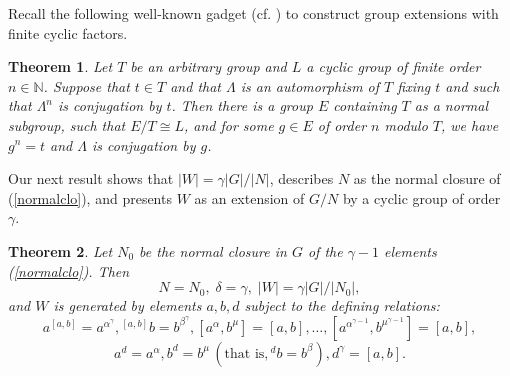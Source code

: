 \documentclass{amsart}
\newtheorem{theorem}{Theorem}[section]
\theoremstyle{definition}
\theoremstyle{remark}
\newcommand \N{{\mathbb N}}
\begin{document}
Recall the following well-known gadget (cf. \cite[Chapter III, Section 7]{Z}) to construct group extensions with finite cyclic factors.

\begin{theorem}\label{z} Let $T$ be an arbitrary group and $L$ a cyclic group of finite order $n\in\N$. Suppose that $t\in T$
and that $\Lambda$ is an automorphism of $T$ fixing $t$ and such that $\Lambda^n$ is conjugation by $t$. Then there
is a group $E$ containing $T$ as a normal subgroup, such that $E/T\cong L$, and for some $g\in E$ of order $n$ modulo $T$, we have 
$g^n=t$ and $\Lambda$ is conjugation by $g$.
\end{theorem}

Our next result shows that $|W|=\gamma |G|/|N|$,
describes $N$ as the normal closure of (\ref{normalclo}), and presents $W$ 
as an extension of $G/N$ by a cyclic group of order $\gamma$.

\begin{theorem}\label{one} Let $N_0$ be the normal closure in $G$ of the $\gamma-1$ elements (\ref{normalclo}).
Then
$$
N=N_0,\;\delta=\gamma,\;|W|=\gamma|G|/|N_0|,
$$
and $W$ is generated by elements  $a,b,d$ subject to the defining relations:
\begin{equation}
\label{defrel}
a^{[a,b]}=a^{\alpha^\gamma}, 
{}^{[a,b]} b=b^{\beta^\gamma}, [a^\alpha,b^\mu]=[a,b],\dots, [a^{\alpha^{\gamma-1}},b^{\mu^{\gamma-1}}]=[a,b],
\end{equation}
\begin{equation}
\label{defrel5}
a^d=a^\alpha, b^d=b^\mu\, (\text{that is}, {}^d b=b^\beta), d^\gamma=[a,b].
\end{equation}
\end{theorem}
\end{document}
